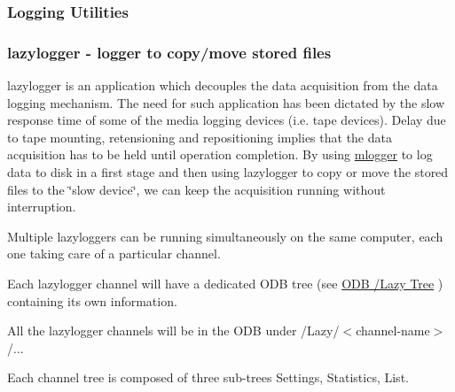 \label{index_end}
\hypertarget{index_end}{}
 \subsubsection{Logging Utilities}\label{F_LogUtil}
\par
 

\par
 \label{F_LogUtil_idx_Logging_lazylogger}
\hypertarget{F_LogUtil_idx_Logging_lazylogger}{}
 \label{F_LogUtil_idx_lazylogger-utility}
\hypertarget{F_LogUtil_idx_lazylogger-utility}{}
 \hypertarget{F_LogUtil_F_lazylogger_utility}{}\subsubsection{lazylogger  -\/ logger to copy/move stored files}\label{F_LogUtil_F_lazylogger_utility}
lazylogger is an application which decouples the data acquisition from the data logging mechanism. The need for such application has been dictated by the slow response time of some of the media logging devices (i.e. tape devices). Delay due to tape mounting, retensioning and repositioning implies that the data acquisition has to be held until operation completion. By using \hyperlink{F_Logging_F_mlogger_utility}{mlogger} to log data to disk in a first stage and then using lazylogger to copy or move the stored files to the \char`\"{}slow device\char`\"{}, we can keep the acquisition running without interruption.
\begin{DoxyItemize}
\item Multiple lazyloggers can be running simultaneously on the same computer, each one taking care of a particular channel.
\item Each lazylogger channel will have a dedicated ODB tree (see \hyperlink{F_LogUtil_F_ODB_Lazy_Tree}{ODB /Lazy Tree} ) containing its own information.
\item All the lazylogger channels will be in the ODB under /Lazy/$<$channel-\/name$>$/...
\item Each channel tree is composed of three sub-\/trees Settings, Statistics, List.
\end{DoxyItemize}

